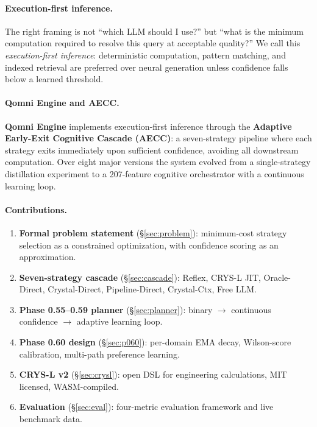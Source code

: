 \documentclass[12pt,a4paper]{article}
\begin{document}
\paragraph{Execution-first inference.}
The right framing is not ``which LLM should I use?'' but
``what is the minimum computation required to resolve this query at acceptable quality?''
We call this \emph{execution-first inference}: deterministic computation,
pattern matching, and indexed retrieval are preferred over neural generation
unless confidence falls below a learned threshold.

\paragraph{Qomni Engine and AECC.}
\textbf{Qomni Engine} implements execution-first inference through the
\textbf{Adaptive Early-Exit Cognitive Cascade (AECC)}: a seven-strategy
pipeline where each strategy exits immediately upon sufficient confidence,
avoiding all downstream computation. Over eight major versions the system
evolved from a single-strategy distillation experiment to a 207-feature
cognitive orchestrator with a continuous learning loop.

\paragraph{Contributions.}
\begin{enumerate}
  \item \textbf{Formal problem statement} (\S\ref{sec:problem}): minimum-cost
    strategy selection as a constrained optimization, with confidence scoring
    as an approximation.
  \item \textbf{Seven-strategy cascade} (\S\ref{sec:cascade}): Reflex,
    CRYS-L JIT, Oracle-Direct, Crystal-Direct, Pipeline-Direct, Crystal-Ctx, Free LLM.
  \item \textbf{Phase 0.55--0.59 planner} (\S\ref{sec:planner}): binary
    $\to$ continuous confidence $\to$ adaptive learning loop.
  \item \textbf{Phase 0.60 design} (\S\ref{sec:p060}): per-domain EMA decay,
    Wilson-score calibration, multi-path preference learning.
  \item \textbf{CRYS-L v2} (\S\ref{sec:crysl}): open DSL for engineering
    calculations, MIT licensed, WASM-compiled.
  \item \textbf{Evaluation} (\S\ref{sec:eval}): four-metric evaluation framework
    and live benchmark data.
\end{enumerate}
\end{document}
